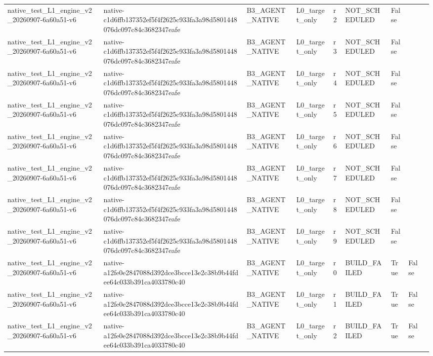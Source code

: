 \begin{tabular}{lllllllll}
native\_test\_L1\_engine\_v2\_20260907-6a60a51-v6 & native-c1d6ffb137352ef5f4f2625c933fa3a98d5801448076dc097c84c3682347eafe & B3\_AGENT\_NATIVE & L0\_target\_only & r2 & NOT\_SCHEDULED & False &  &  \\
native\_test\_L1\_engine\_v2\_20260907-6a60a51-v6 & native-c1d6ffb137352ef5f4f2625c933fa3a98d5801448076dc097c84c3682347eafe & B3\_AGENT\_NATIVE & L0\_target\_only & r3 & NOT\_SCHEDULED & False &  &  \\
native\_test\_L1\_engine\_v2\_20260907-6a60a51-v6 & native-c1d6ffb137352ef5f4f2625c933fa3a98d5801448076dc097c84c3682347eafe & B3\_AGENT\_NATIVE & L0\_target\_only & r4 & NOT\_SCHEDULED & False &  &  \\
native\_test\_L1\_engine\_v2\_20260907-6a60a51-v6 & native-c1d6ffb137352ef5f4f2625c933fa3a98d5801448076dc097c84c3682347eafe & B3\_AGENT\_NATIVE & L0\_target\_only & r5 & NOT\_SCHEDULED & False &  &  \\
native\_test\_L1\_engine\_v2\_20260907-6a60a51-v6 & native-c1d6ffb137352ef5f4f2625c933fa3a98d5801448076dc097c84c3682347eafe & B3\_AGENT\_NATIVE & L0\_target\_only & r6 & NOT\_SCHEDULED & False &  &  \\
native\_test\_L1\_engine\_v2\_20260907-6a60a51-v6 & native-c1d6ffb137352ef5f4f2625c933fa3a98d5801448076dc097c84c3682347eafe & B3\_AGENT\_NATIVE & L0\_target\_only & r7 & NOT\_SCHEDULED & False &  &  \\
native\_test\_L1\_engine\_v2\_20260907-6a60a51-v6 & native-c1d6ffb137352ef5f4f2625c933fa3a98d5801448076dc097c84c3682347eafe & B3\_AGENT\_NATIVE & L0\_target\_only & r8 & NOT\_SCHEDULED & False &  &  \\
native\_test\_L1\_engine\_v2\_20260907-6a60a51-v6 & native-c1d6ffb137352ef5f4f2625c933fa3a98d5801448076dc097c84c3682347eafe & B3\_AGENT\_NATIVE & L0\_target\_only & r9 & NOT\_SCHEDULED & False &  &  \\
native\_test\_L1\_engine\_v2\_20260907-6a60a51-v6 & native-a12fe0e2847088d392dce3bcce13e2c38b9b44fdee64c033b391ca4033780c40 & B3\_AGENT\_NATIVE & L0\_target\_only & r0 & BUILD\_FAILED & True & False &  \\
native\_test\_L1\_engine\_v2\_20260907-6a60a51-v6 & native-a12fe0e2847088d392dce3bcce13e2c38b9b44fdee64c033b391ca4033780c40 & B3\_AGENT\_NATIVE & L0\_target\_only & r1 & BUILD\_FAILED & True & False &  \\
native\_test\_L1\_engine\_v2\_20260907-6a60a51-v6 & native-a12fe0e2847088d392dce3bcce13e2c38b9b44fdee64c033b391ca4033780c40 & B3\_AGENT\_NATIVE & L0\_target\_only & r2 & BUILD\_FAILED & True & False &  \\

\end{tabular}
